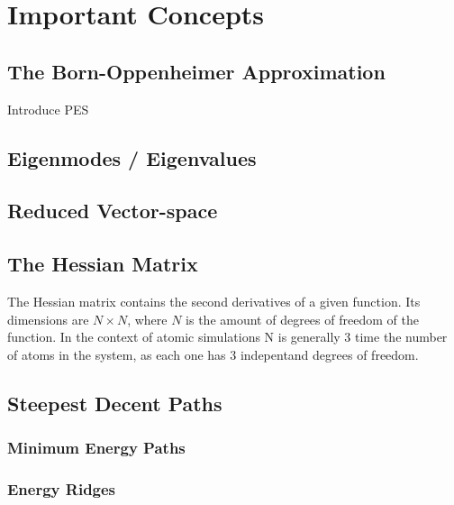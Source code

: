 \section{Important Concepts}
\subsection{The Born-Oppenheimer Approximation}
\bit
\item Introduce PES
\eit
\placeholder

\subsection{Eigenmodes / Eigenvalues}
\placeholder

\subsection{Reduced Vector-space}
\placeholder

\subsection{The Hessian Matrix}
The Hessian matrix contains the second derivatives of a given function.
Its dimensions are $N\times N$, where $N$ is the amount of degrees of freedom of the function.
In the context of atomic simulations N is generally 3 time the number of atoms in the system, as each one has 3 indepentand degrees of freedom.
\incomplete

\subsection{Steepest Decent Paths}
\placeholder
\subsubsection{Minimum Energy Paths}
\placeholder
\subsubsection{Energy Ridges}
\placeholder
